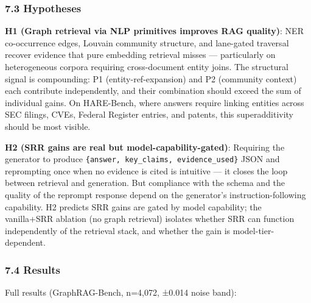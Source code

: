 \documentclass[
]{article}
\begin{document}
\subsubsection{7.3 Hypotheses}\label{hypotheses}

\textbf{H1 (Graph retrieval via NLP primitives improves RAG quality)}:
NER co-occurrence edges, Louvain community structure, and lane-gated
traversal recover evidence that pure embedding retrieval misses ---
particularly on heterogeneous corpora requiring cross-document entity
joins. The structural signal is compounding: P1 (entity-ref-expansion)
and P2 (community context) each contribute independently, and their
combination should exceed the sum of individual gains. On HARE-Bench,
where answers require linking entities across SEC filings, CVEs, Federal
Register entries, and patents, this superadditivity should be most
visible.

\textbf{H2 (SRR gains are real but model-capability-gated)}: Requiring
the generator to produce
\texttt{\{answer,\ key\_claims,\ evidence\_used\}} JSON and reprompting
once when no evidence is cited is intuitive --- it closes the loop
between retrieval and generation. But compliance with the schema and the
quality of the reprompt response depend on the generator's
instruction-following capability. H2 predicts SRR gains are gated by
model capability; the vanilla+SRR ablation (no graph retrieval) isolates
whether SRR can function independently of the retrieval stack, and
whether the gain is model-tier-dependent.

\subsubsection{7.4 Results}\label{results}

Full results (GraphRAG-Bench, n=4,072, ±0.014 noise band):
\end{document}
